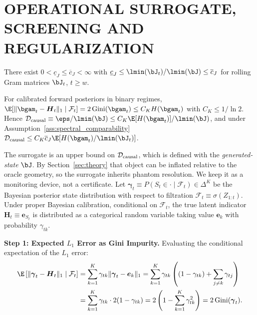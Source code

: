 \section{OPERATIONAL SURROGATE, SCREENING AND REGULARIZATION}
\label{app:surrogate}
\begin{assumption}
\label{ass:spectral_comparability}
There exist $0<\underline c_J\le\overline c_J<\infty$ with $\underline c_J\le\lmin(\bJ_t)/\lmin(\bJ)\le\overline c_J$ for rolling Gram matrices $\bJ_t$, $t\ge w$.
\end{assumption}
\begin{proposition}
\label{prop:bridge}
For calibrated forward posteriors in binary regimes, $\E[\|\bgam_t-\boldsymbol H_t\|_1\mid\mathcal F_t]=2\,\mathrm{Gini}(\bgam_t)\le C_KH(\bgam_t)$ with $C_K\le1/\ln2$. Hence $\mathcal D_{\rm causal}\equiv\eps/\lmin(\bJ)\le C_K\E[H(\bgam_t)]/\lmin(\bJ)$, and under Assumption~\ref{ass:spectral_comparability} $\mathcal D_{\rm causal}\le C_K\overline c_J\E[H(\bgam_t)/\lmin(\bJ_t)]$.
\end{proposition}
The surrogate is an upper bound on $\mathcal D_{\rm causal}$, which is defined with the \emph{generated-state} $\bJ$. By Section~\ref{sec:theory} that object can be inflated relative to the oracle geometry, so the surrogate inherits phantom resolution. We keep it as a monitoring device, not a certificate.
Let $\boldsymbol{\gamma}_t \equiv P(S_t \in \cdot \mid \mathcal{F}_t) \in \Delta^K$ be the Bayesian posterior state distribution with respect to filtration $\mathcal{F}_t \equiv \sigma(Z_{1:t})$. Under proper Bayesian calibration, conditional on $\mathcal{F}_t$, the true latent indicator $\boldsymbol{H}_t \equiv \boldsymbol{e}_{S_t}$ is distributed as a categorical random variable taking value $\boldsymbol{e}_k$ with probability $\gamma_{tk}$.

\textbf{Step 1: Expected $L_1$ Error as Gini Impurity.}
Evaluating the conditional expectation of the $L_1$ error:
\begin{align}
    \E\left[ \|\boldsymbol{\gamma}_t - \boldsymbol{H}_t\|_1 \;\middle|\; \mathcal{F}_t \right] &= \sum_{k=1}^K \gamma_{tk} \|\boldsymbol{\gamma}_t - \boldsymbol{e}_k\|_1 = \sum_{k=1}^K \gamma_{tk} \left( (1 - \gamma_{tk}) + \sum_{j \neq k} \gamma_{tj} \right) \nonumber \\
    &= \sum_{k=1}^K \gamma_{tk} \cdot 2(1 - \gamma_{tk}) = 2\left( 1 - \sum_{k=1}^K \gamma_{tk}^2 \right) = 2 \operatorname{Gini}(\boldsymbol{\gamma}_t).
\end{align}

